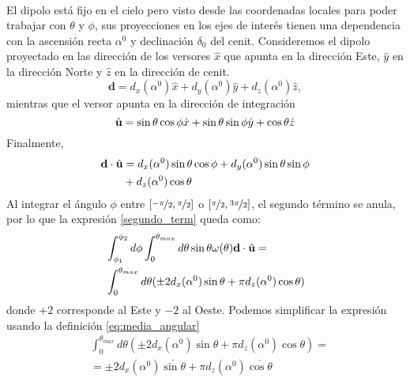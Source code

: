 \begin{enumerate}
\begin{align}
    \end{align}
    \noindent El dipolo está fijo en el cielo pero visto desde las coordenadas locales para poder trabajar con $\theta$ y $\phi$, sus proyecciones en los ejes de interés tienen una dependencia con la ascensión recta  $\alpha^0$ y declinación $\delta_0$ del cenit. %
    Consideremos el dipolo proyectado en las dirección de los versores $\hat{x}$  que apunta en la dirección Este, $\hat{y}$ en la dirección Norte  y $\hat{z}$ en la dirección de cenit.
    \begin{equation*}
        \textbf{d} =  d_x(\alpha^0)\hat{x} +  d_y(\alpha^0)\hat{y}+ d_z(\alpha^0)\hat{z} ,
    \end{equation*}
    \noindent mientras que el versor apunta en la dirección de integración
    \begin{equation*}
        \hat{\bf{u}} =\sin\theta \cos\phi \hat{x} + \sin\theta \sin\phi \hat{y} + \cos\theta\hat{z}
    \end{equation*}
    Finalmente,
    \begin{align*}
        \textbf{d}\cdot\hat{\bf{u}} &= d_x(\alpha^0)\sin\theta \cos\phi
        + d_y(\alpha^0) \sin\theta \sin\phi  \\
        & + d_z(\alpha^0)\cos\theta
    \end{align*}
    Al integrar el ángulo  $\phi$ entre $[\nicefrac{-\pi}{2}, \nicefrac{\pi}{2}]$ o $[\nicefrac{\pi}{2}, \nicefrac{3\pi}{2}]$, el segundo término  se anula, por lo que la expresión \ref{segundo_term} queda como:
    \begin{align*}
        &\int_{\phi_1}^{\phi_2} d\phi \int_{0}^{\theta_{max}}  d\theta \sin\theta \omega(\theta)\textbf{d}\cdot\hat{\bf{u}} =\\
        &\int_{0}^{\theta_{max}}  d\theta (\pm 2d_x(\alpha^0)\sin\theta 
        + \pi d_z(\alpha^0)\cos\theta)
    \end{align*}     
    \noindent donde $+2$ corresponde al Este y $-2$ al Oeste. Podemos simplificar la expresión usando la definición \ref{eq:media_angular}
    \begin{align*}
    &\int_{0}^{\theta_{max}}  d\theta (\pm 2d_x(\alpha^0)\sin\theta 
    + \pi d_z(\alpha^0)\cos\theta)=\\ 
    & =\pm 2d_x(\alpha^0)\overline{\sin\theta} 
    + \pi d_z(\alpha^0)\overline{\cos\theta}\\
    \end{align*}




\end{enumerate}
